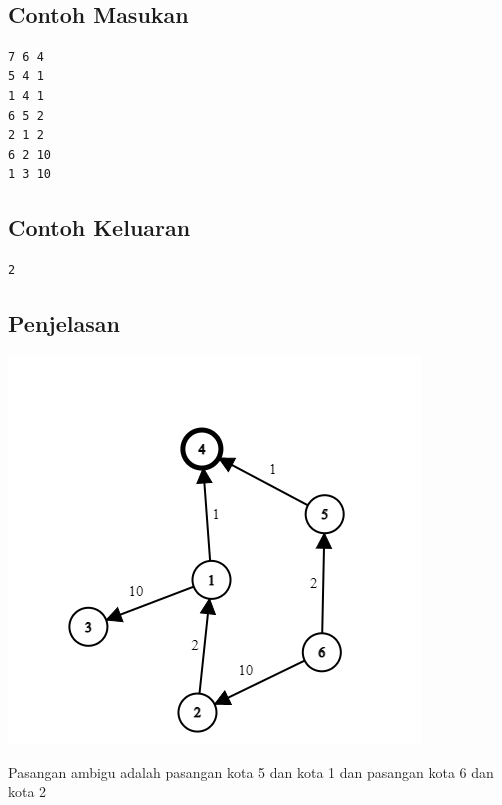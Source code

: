 \documentclass{article}
\begin{document}
\\

\begin{multicols}{2}
\subsection*{Contoh Masukan}
\begin{lstlisting}
7 6 4
5 4 1
1 4 1
6 5 2
2 1 2
6 2 10
1 3 10

\end{lstlisting}
\columnbreak
\subsection*{Contoh Keluaran}
\begin{lstlisting}
2 
\end{lstlisting}
\vfill
\null
\end{multicols}


\pagebreak
\subsection*{Penjelasan}
\begin{center}
    \includegraphics{graph.png}
\end{center}
Pasangan ambigu adalah pasangan kota 5 dan kota 1 dan pasangan kota 6 dan kota 2


\pagebreak
\end{document}
